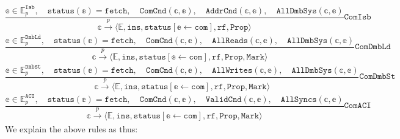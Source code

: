 \documentclass{article}
\newcommand{\var}{\texttt}
\begin{document}
$$\frac{\mathbb{e} \in \mathbb{E}_p^\texttt{Isb}, \hspace{1em} \texttt{status}(\mathbb{e}) = \texttt{fetch}, \hspace{1em} \texttt{ComCnd}(\mathbb{c},\mathbb{e}), \hspace{1em} \var{AddrCnd}(\mathbb{c},\mathbb{e}), \hspace{1em} \texttt{AllDmbSys}(\mathbb{c},\mathbb{e})}{\mathbb{c} \xrightarrow[]{p} \langle \mathbb{E}, \texttt{ins}, \texttt{status}[\mathbb{e} \leftarrow \texttt{com}], \texttt{rf}, \texttt{Prop}\rangle} \texttt{ComIsb} $$
$$\frac{\mathbb{e} \in \mathbb{E}_p^\texttt{DmbLd}, \hspace{1em} \texttt{status}(\mathbb{e}) = \texttt{fetch}, \hspace{1em} \texttt{ComCnd}(\mathbb{c},\mathbb{e}), \hspace{1em} \texttt{AllReads}(\mathbb{c},\mathbb{e}), \hspace{1em} \texttt{AllDmbSys}(\mathbb{c},\mathbb{e})}{\mathbb{c} \xrightarrow[]{p} \langle \mathbb{E}, \texttt{ins}, \texttt{status}[\mathbb{e} \leftarrow \texttt{com}], \texttt{rf}, \texttt{Prop}, \var{Mark}\rangle} \texttt{ComDmbLd} $$
$$\frac{\mathbb{e} \in \mathbb{E}_p^\texttt{DmbSt}, \hspace{1em} \texttt{status}(\mathbb{e}) = \texttt{fetch}, \hspace{1em} \texttt{ComCnd}(\mathbb{c},\mathbb{e}), \hspace{1em} \texttt{AllWrites}(\mathbb{c},\mathbb{e}), \hspace{1em} \texttt{AllDmbSys}(\mathbb{c},\mathbb{e})}{\mathbb{c} \xrightarrow[]{p} \langle \mathbb{E}, \texttt{ins}, \texttt{status}[\mathbb{e} \leftarrow \texttt{com}], \texttt{rf}, \texttt{Prop}, \var{Mark}\rangle} \texttt{ComDmbSt} $$
$$\frac{\mathbb{e} \in \mathbb{E}_p^\texttt{ACI}, \hspace{1em} \texttt{status}(\mathbb{e}) = \texttt{fetch}, \hspace{1em} \texttt{ComCnd}(\mathbb{c},\mathbb{e}), \hspace{1em} \texttt{ValidCnd}(\mathbb{c},\mathbb{e}), \hspace{1em} \texttt{AllSyncs}(\mathbb{c},\mathbb{e})}{\mathbb{c} \xrightarrow[]{p} \langle \mathbb{E}, \texttt{ins}, \texttt{status}[\mathbb{e} \leftarrow \texttt{com}], \texttt{rf}, \texttt{Prop}, \var{Mark}\rangle} \texttt{ComACI} $$
We explain the above rules as thus:
\end{document}
